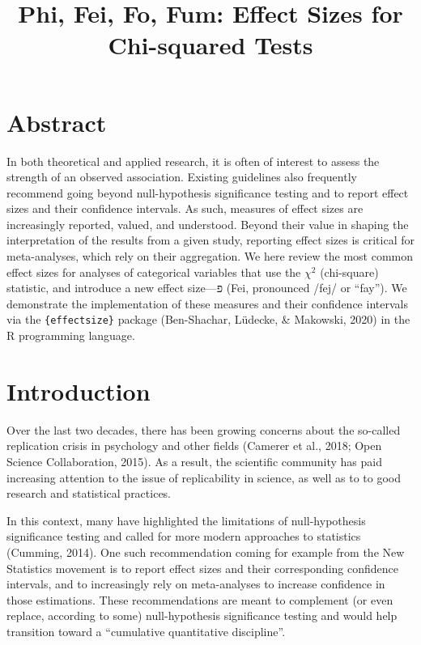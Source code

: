 \documentclass[
]{article}
\title{Phi, Fei, Fo, Fum: Effect Sizes for Chi-squared Tests}
\author{}
\date{\vspace{-2.5em}}
\begin{document}
\maketitle

\hypertarget{abstract}{%
\section{Abstract}\label{abstract}}

In both theoretical and applied research, it is often of interest to
assess the strength of an observed association. Existing guidelines also
frequently recommend going beyond null-hypothesis significance testing
and to report effect sizes and their confidence intervals. As such,
measures of effect sizes are increasingly reported, valued, and
understood. Beyond their value in shaping the interpretation of the
results from a given study, reporting effect sizes is critical for
meta-analyses, which rely on their aggregation. We here review the most
common effect sizes for analyses of categorical variables that use the
\(\chi^2\) (chi-square) statistic, and introduce a new effect size---פ
(Fei, pronounced /fej/ or ``fay''). We demonstrate the implementation of
these measures and their confidence intervals via the
\texttt{\{effectsize\}} package (Ben-Shachar, Lüdecke, \& Makowski,
2020) in the R programming language.

\hypertarget{introduction}{%
\section{Introduction}\label{introduction}}

Over the last two decades, there has been growing concerns about the
so-called replication crisis in psychology and other fields (Camerer et
al., 2018; Open Science Collaboration, 2015). As a result, the
scientific community has paid increasing attention to the issue of
replicability in science, as well as to to good research and statistical
practices.

In this context, many have highlighted the limitations of
null-hypothesis significance testing and called for more modern
approaches to statistics (Cumming, 2014). One such recommendation coming
for example from the New Statistics movement is to report effect sizes
and their corresponding confidence intervals, and to increasingly rely
on meta-analyses to increase confidence in those estimations. These
recommendations are meant to complement (or even replace, according to
some) null-hypothesis significance testing and would help transition
toward a ``cumulative quantitative discipline''.
\end{document}
